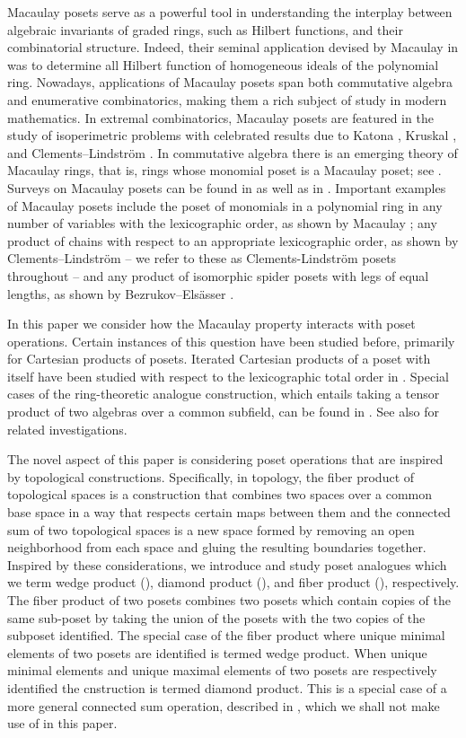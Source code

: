 \documentclass[11pt, reqno]{amsart}
\theoremstyle{plain} %
\theoremstyle{definition}
\theoremstyle{remark}
\numberwithin{equation}{section}  %
\begin{document}
Macaulay posets serve as a powerful tool in understanding the interplay between algebraic invariants of graded rings, such as Hilbert functions, and their combinatorial structure. Indeed, their seminal application devised by Macaulay in \cite{Mac} was to determine all Hilbert function of homogeneous ideals of the polynomial ring. Nowadays,  applications of Macaulay posets span both commutative algebra  and enumerative combinatorics, making them a rich subject of study in modern mathematics. In extremal combinatorics, Macaulay posets are featured in the study of isoperimetric problems with celebrated results due to Katona \cite{Katona}, Kruskal \cite{Kruskal}, and Clements--Lindstr\"om \cite{CL}.  In commutative algebra there is an emerging theory of Macaulay rings, that is, rings whose monomial poset is a Macaulay poset; see \cite{Mermin, MP, MP2, Kuz}. Surveys on Macaulay posets can be found in \cite{BL} as well as in \cite[Chapter 8]{Engel}. Important examples of Macaulay posets include the poset of monomials in a polynomial ring in any number of variables with the lexicographic order, as shown by Macaulay \cite{Mac}; any product of chains with respect to an appropriate  lexicographic order, as shown by Clements--Lindstr\"om \cite{CL} -- we refer to these as Clements-Lindstr\"om posets throughout -- and any product of isomorphic spider posets with legs of equal lengths, as shown by Bezrukov--Els\"asser \cite{BE}.

In this paper we consider how the Macaulay property interacts with poset operations. Certain instances of this question have been studied before, primarily for  Cartesian products of posets. Iterated Cartesian products of a poset with itself have been studied with respect to the lexicographic total order in \cite{uwsuper}. Special cases of the ring-theoretic analogue construction, which entails taking a tensor product of  two algebras over a common subfield, can be found in \cite[Theorem 4.1]{MP}. See also \cite[Theorem 10]{BL}  for related investigations.

The novel aspect of this paper is considering poset operations that are inspired by  topological  constructions. Specifically, in topology, the fiber product of topological spaces is a construction that combines two spaces over a common base space  in a way that respects certain maps between them and the connected sum of two topological spaces is a new space formed by removing an open neighborhood  from each space and gluing the resulting boundaries together. 
Inspired by these considerations, we introduce and study poset analogues  which we term wedge product (), diamond product (), and fiber product (), respectively.
The fiber product of two posets combines two posets which contain copies of the same sub-poset by taking the union of the posets with the two copies of the subposet identified. The special case of the fiber product where unique minimal elements of two posets are identified is termed wedge product.  When unique minimal elements and unique maximal elements of two posets are respectively identified the cnstruction is termed diamond product. This is a special case of a more general connected sum operation, described in \cite{BKLS}, which we shall not make use of in this paper.  
\end{document}
